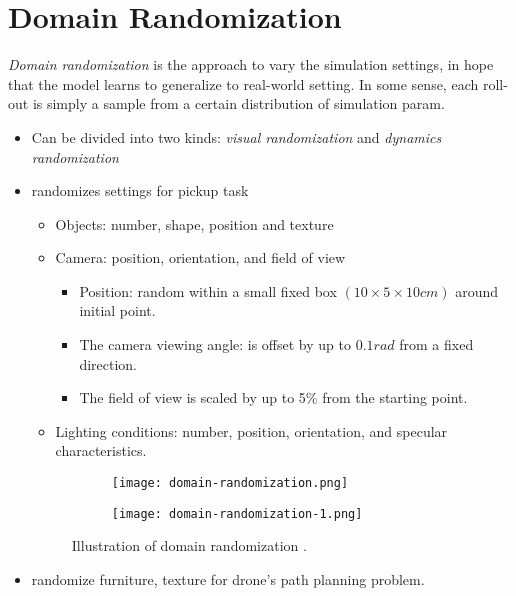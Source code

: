 \section{Domain Randomization}
\textit{Domain randomization} is the approach to vary the simulation settings, in hope that the model learns to generalize to real-world setting. In some sense, each roll-out is simply a sample from a certain distribution of simulation \ac{param}.
\begin{itemize}
	\item Can be divided into two kinds: \textit{visual randomization} and \textit{dynamics randomization}
	\item {} randomizes settings for pickup task
	\begin{itemize}
		\item Objects: number, shape, position and texture
		\item Camera: position, orientation, and field of view
		\begin{itemize}
			\item Position: random within a small fixed box $ (10\times5\times10cm) $ around initial point.
			\item The camera viewing angle: is offset by up to $ 0.1 rad $ from a fixed direction.
			\item The field of view is scaled by up to 5\% from the starting point.
		\end{itemize}	
		\item Lighting conditions: number, position, orientation, and specular characteristics.
	\end{itemize}
	\begin{figure}[hbt!]
		\centering
		\begin{subfigure}[b]{0.4\textwidth}
			\centering
			\texttt{[image: domain-randomization.png]}
		\end{subfigure}
		\hfill
		\begin{subfigure}[b]{0.57\textwidth}
			\centering
			\texttt{[image: domain-randomization-1.png]}
		\end{subfigure}
		\caption{Illustration of domain randomization \cite{sadeghi2016cad2rl, tobin2017domain}.}
		\label{fig:domain-randomization}
	\end{figure}	
	\item {} randomize furniture, texture for drone's path planning problem.
\end{itemize}

